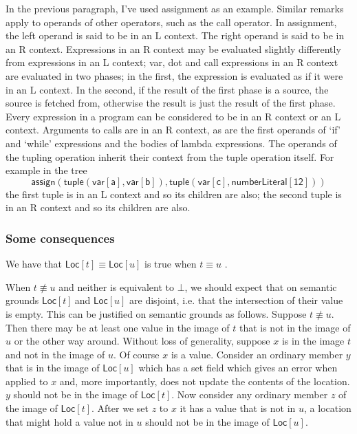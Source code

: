 \documentclass[12pt]{article}
\begin{document}
In the previous paragraph, I've used assignment as an example. Similar
remarks apply to operands of other operators, such as the call operator. In
assignment, the left operand is said to be in an L context. The right
operand is said to be in an R context. Expressions in an R context may be
evaluated slightly differently from expressions in an L context; var, dot
and call expressions in an R context are evaluated in two phases; in the
first, the expression is evaluated as if it were in an L context. In the
second, if the result of the first phase is a source, the source is fetched
from, otherwise the result is just the result of the first phase. Every
expression in a program can be considered to be in an R context or an L
context. Arguments to calls are in an R context, as are the first operands
of `if' and `while' expressions and the bodies of lambda expressions. The
operands of the tupling operation inherit their context from the tuple
operation itself. For example in the tree%
\begin{equation*}
\mathsf{assign(tuple(var[a],var[b]),tuple(var[c],numberLiteral[12]))}
\end{equation*}%
the first tuple is in an L context and so its children are also; the second
tuple is in an R context and so its children are also.

\subsubsection{Some consequences}

We have that $\mathsf{Loc}[t]\equiv \mathsf{Loc}[u]$ is true when $t\equiv u$%
.

When $t\not\equiv u$ and neither is equivalent to $\bot $, we should expect
that on semantic grounds $\mathsf{Loc}[t]\ $and $\mathsf{Loc}[u]$ are
disjoint, i.e. that the intersection of their value is empty. This can be
justified on semantic grounds as follows. Suppose $t\not\equiv u$. Then
there may be at least one value in the image of $t$ that is not in the image
of $u$ or the other way around. Without loss of generality, suppose $x$ is
in the image $t$ and not in the image of $u$. Of course $x$ is a value.
Consider an ordinary member $y$ that is in the image of $\mathsf{Loc}\left[ u%
\right] $ which has a set field which gives an error when applied to $x$
and, more importantly, does not update the contents of the location. $y$
should not be in the image of $\mathsf{Loc}[t]$. Now consider any ordinary
member $z$ of the image of $\mathsf{Loc}[t]$. After we set $z$ to $x$ it has
a value that is not in $u$, a location that might hold a value not in $u$
should not be in the image of $\mathsf{Loc}\left[ u\right] $.
\end{document}
